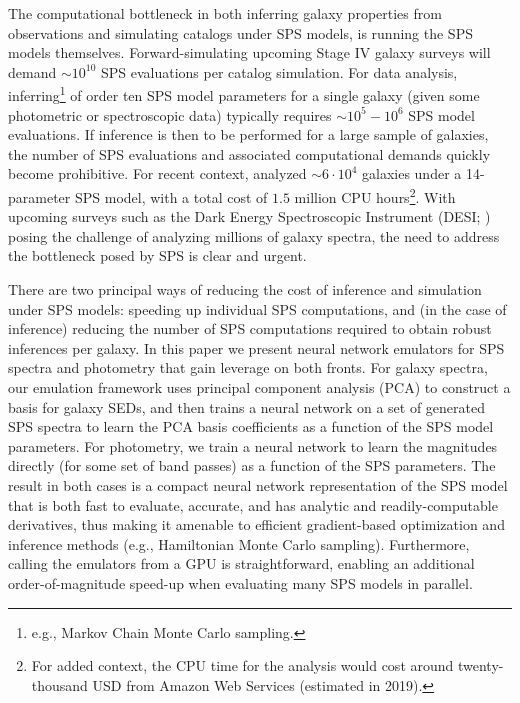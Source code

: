 \documentclass[twocolumn]{aastex62}
\begin{document}
The computational bottleneck in both inferring galaxy properties from observations and simulating catalogs under SPS models, is running the SPS models themselves. Forward-simulating upcoming Stage IV galaxy surveys will demand $\sim10^{10}$ SPS evaluations per catalog simulation. For data analysis, inferring\footnote{e.g., Markov Chain Monte Carlo sampling.} of order ten SPS model parameters for a single galaxy (given some photometric or spectroscopic data) typically requires $\sim10^5-10^6$ SPS model evaluations. If inference is then to be performed for a large sample of galaxies, the number of SPS evaluations and associated computational demands quickly become prohibitive. For recent context, \citet{leja2019} analyzed $\sim 6\cdot 10^4$ galaxies under a 14-parameter SPS model, with a total cost of $1.5$ million CPU hours\footnote{For added context, the CPU time for the \citet{leja2019} analysis would cost around twenty-thousand USD from Amazon Web Services (estimated in 2019).}. With upcoming surveys such as the Dark Energy Spectroscopic Instrument (DESI; \citealp{levi2013,aghamousa2016,aghamousa2018}) posing the challenge of analyzing millions of galaxy spectra, the need to address the bottleneck posed by SPS is clear and urgent.

There are two principal ways of reducing the cost of inference and simulation under SPS models: speeding up individual SPS computations, and (in the case of inference) reducing the number of SPS computations required to obtain robust inferences per galaxy. In this paper we present neural network emulators for SPS spectra and photometry that gain leverage on both fronts. For galaxy spectra, our emulation framework uses principal component analysis (PCA) to construct a basis for galaxy SEDs, and then trains a neural network on a set of generated SPS spectra to learn the PCA basis coefficients as a function of the SPS model parameters. For photometry, we train a neural network to learn the magnitudes directly (for some set of band passes) as a function of the SPS parameters. The result in both cases is a compact neural network representation of the SPS model that is both fast to evaluate, accurate, and has analytic and readily-computable derivatives, thus making it amenable to efficient gradient-based optimization and inference methods (e.g., Hamiltonian Monte Carlo sampling). Furthermore, calling the emulators from a GPU is straightforward, enabling an additional order-of-magnitude speed-up when evaluating many SPS models in parallel.
\end{document}
